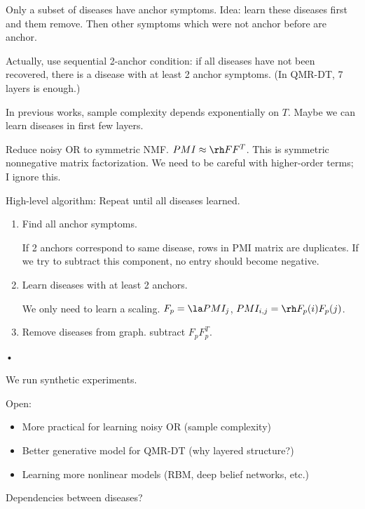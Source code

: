 Only a subset of diseases have anchor symptoms. Idea: learn these diseases first and them remove. Then other symptoms which were not anchor before are anchor.

Actually, use sequential 2-anchor condition: if all diseases have not been recovered, there is a disease with at least 2 anchor symptoms. (In QMR-DT, 7 layers is enough.)

In previous works, sample complexity depends exponentially on $T$. Maybe we can learn diseases in first few layers. 

Reduce noisy OR to symmetric NMF. $PMI\approx \rh FF^T$. 
This is symmetric nonnegative matrix factorization. We need to be careful with higher-order terms; I ignore this.

High-level algorithm: Repeat until all diseases learned.
\begin{enumerate}
\item
Find all anchor symptoms. 

If 2 anchors correspond to same disease, rows in PMI matrix are duplicates. %
If we try to subtract this component, no entry should become negative.  
\item
Learn diseases with at least 2 anchors. 

We only need to learn a scaling. $F_p=\la PMI_j$, $PMI_{i,j} = \rh F_p(i)F_p(j)$.
\item Remove diseases from graph. subtract $F_pF_p^T$. 
\end{enumerate}•

We run synthetic experiments. 

Open:
\begin{itemize}
\item
More practical for learning noisy OR (sample complexity)
\item
Better generative model for QMR-DT (why layered structure?)
\item
Learning more nonlinear models (RBM, deep belief networks, etc.)
\end{itemize}


Dependencies between diseases?